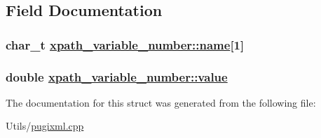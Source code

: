 \subsection{Field Documentation}
\hypertarget{structxpath__variable__number_2bf4163dab1a8e233d45677fee987f0f}{
\subsubsection[name]{\setlength{\rightskip}{0pt plus 5cm}char\_\-t \hyperlink{structxpath__variable__number_2bf4163dab1a8e233d45677fee987f0f}{xpath\_\-variable\_\-number::name}\mbox{[}1\mbox{]}}}
\label{structxpath__variable__number_2bf4163dab1a8e233d45677fee987f0f}


\hypertarget{structxpath__variable__number_49949397348e7c941d88a694ec5c8e57}{
\subsubsection[value]{\setlength{\rightskip}{0pt plus 5cm}double \hyperlink{structxpath__variable__number_49949397348e7c941d88a694ec5c8e57}{xpath\_\-variable\_\-number::value}}}
\label{structxpath__variable__number_49949397348e7c941d88a694ec5c8e57}




The documentation for this struct was generated from the following file:\begin{CompactItemize}
\item 
Utils/\hyperlink{pugixml_8cpp}{pugixml.cpp}\end{CompactItemize}
